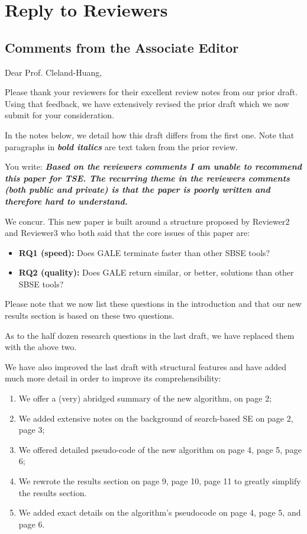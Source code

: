 \documentclass[10pt,journal,compsoc]{IEEEtran}
\newcommand{\bi}{\begin{itemize}}
\newcommand{\ei}{\end{itemize}}
\newcommand{\be}{\begin{enumerate}}
\newcommand{\ee}{\end{enumerate}}
\begin{document}
\clearpage
 \setcounter{page}{1}
\section*{Reply to Reviewers}
\subsection*{Comments from the Associate Editor}

Dear Prof. Cleland-Huang, 

Please thank your reviewers for their excellent review notes from our
prior draft. 
Using that feedback, we  have extensively revised the prior draft which
we now submit for your consideration. 

In the notes below, we detail how this draft differs from the first one. Note that paragraphs in {\bf {\em bold italics}}
are text taken from the prior review.


You write: {\bf {\em Based on the reviewers comments I am unable to
  recommend this paper for TSE.  The recurring theme
  in the reviewers comments (both public and
  private) is that the paper is poorly written and
  therefore hard to understand.}}
  
 

We concur.  This new paper is built around a structure proposed by Reviewer2 and
Reviewer3 who both said that the core issues of this paper are:
\bi
\item
{\bf RQ1 (speed):} Does GALE terminate faster than other SBSE tools?
\item 
{\bf RQ2 (quality):} Does GALE return  similar, or better,
solutions than other SBSE tools?
\ei
Please note that we now list these questions in the introduction and that our
new results section is based on these two questions.

As to the half dozen research questions in the last draft, 
we have replaced them with the above two.

We have also improved the last draft with structural features
and have added much more detail  in order
to improve its comprehensibility:
\be
\item We offer a (very) abridged summary of the new algorithm, on page 2;
\item We added extensive notes on the background of search-based SE on page 2, page 3;
\item We offered detailed pseudo-code of the new algorithm on page 4, page 5, page 6;
\item We rewrote the results section on page 9, page 10, page 11 to greatly simplify the results section.
\item  We added exact details on the algorithm's pseudocode on page 4, page 5, and page 6.
\ee
\end{document}
